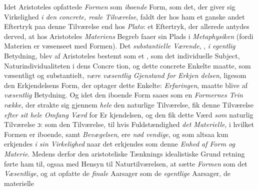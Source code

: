 Idet Aristoteles opfattede \emph{Formen} som \emph{iboende} Form,
som det, der giver sig Virkelighed \emph{i den concrete, reale
Tilværelse}, faldt der hos ham et ganske andet Eftertryk
paa denne Tilværelse end hos \emph{Plato}: et Eftertryk, der allerede
antydes derved, at hos Aristoteles \emph{Materiens} Begreb faaer
sin Plads i \emph{Metaphysiken} (fordi Materien er væsenseet med
Formen). Det \emph{substantielle Værende}, , \emph{i egentlig}
Betydning, blev af Aristoteles bestemt som et , som
det individuelle Subject, Naturindividualiteten i dens Concre\-%
tion, og dette concrete Enkelte maatte, som væsentligt og
substantielt, \emph{være væsentlig Gjenstand for Erkjen\-%
delsen}, ligesom den Erkjendelsens Form, der optager dette
Enkelte: \emph{Erfaringen}, maatte blive af \emph{væsentlig} Betydning.
Og idet den iboende Form saaes som en \emph{Formernes Trin\-%
række}, der strakte sig gjennem \emph{hele} den naturlige Tilværelse,
fik denne Tilværelse \emph{efter sit hele Omfang Værd} for Er\-%
kjendelsen, og den fik dette Værd \emph{som} naturlig Tilværelse ɔ:
som den Tilværelse, til hvis Fuldstændighed \emph{det Materielle},
i hvilket Formen er iboende, samt \emph{Bevægelsen}, ere \emph{nød\-%
vendige}, og som altsaa kun erkjendes \emph{i sin Virkelighed}
naar det erkjendes som denne \emph{Enhed af Form og Materie}.
Medens derfor den aristoteliske Tænknings idealistiske Grund\-%
retning førte ham til, ogsaa med Hensyn til Naturtilværelsen,
at sætte \emph{Formen} som det \emph{Væsentlige}, og at opfatte de
\emph{finale} Aarsager som de \emph{egentlige} Aarsager, de materielle
